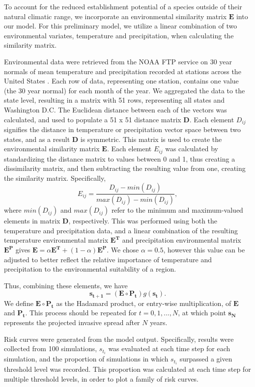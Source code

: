 \documentclass[12pt]{article}
\begin{document}
To account for the reduced establishment potential of a species outside of their natural climatic range, we incorporate an environmental similarity matrix $\mathbf{E}$ into our model. For this preliminary model, we utilize a linear combination of two environmental variates, temperature and precipitation, when calculating the similarity matrix.

Environmental data were retrieved from the NOAA FTP service on 30 year normals of mean temperature and precipitation recorded at stations across the United States \citep{NOAA}. Each row of data, representing one station, contains one value (the 30 year normal) for each month of the year. We aggregated the data to the state level, resulting in a matrix with 51 rows, representing all states and Washington D.C. The Euclidean distance between each of the vectors was calculated, and used to populate a 51 x 51 distance matrix $\mathbf{D}$. Each element $D_{ij}$ signifies the distance in temperature or precipitation vector space between two states, and as a result $\mathbf{D}$ is symmetric. This matrix is used to create the environmental similarity matrix $\mathbf{E}$. Each element $E_{ij}$ was calculated by standardizing the distance matrix to values between 0 and 1, thus creating a dissimilarity matrix, and then subtracting the resulting value from one, creating the similarity matrix. Specifically,
\[
   E_{ij} = \frac{D_{ij} - min\left(D_{ij}\right)}{max\left(D_{ij}\right) - min\left(D_{ij}\right)},
\]
where $min(D_{ij})$ and $max(D_{ij})$ refer to the minimum and maximum-valued elements in matrix $\mathbf{D}$, respectively.  This was performed using both the temperature and precipitation data, and a linear combination of the resulting temperature environmental matrix $\mathbf{E^{T}}$ and precipitation environmental matrix $\mathbf{E^{P}}$ gives $\mathbf{E} = \alpha \mathbf{E^{T}} + (1-\alpha) \mathbf{E^{P}}$.  We chose $\alpha = 0.5$, however this value can be adjusted to better reflect the relative importance of temperature and precipitation to the environmental suitability of a region.

Thus, combining these elements, we have
\[
	\mathbf{s_{t+1}} = (\mathbf{E}  \circ \mathbf{P_t}) g(\mathbf{s_t}).
\]
We define $\mathbf{E} \circ \mathbf{P_t}$ as the Hadamard product, or entry-wise multiplication, of $\mathbf{E}$ and $\mathbf{P_t}$.  This process should be repeated for $t=0,1,...,N$, at which point $\mathbf{s_N}$ represents the projected invasive spread after $N$ years. 

Risk curves were generated from the model output. Specifically, results were collected from 100 simulations, $s_{t_i}$ was evaluated at each time step for each simulation, and the proportion of simulations in which $s_{t_i}$ surpassed a given threshold level was recorded. This proportion was calculated at each time step for multiple threshold levels, in order to plot a family of risk curves.
\end{document}
